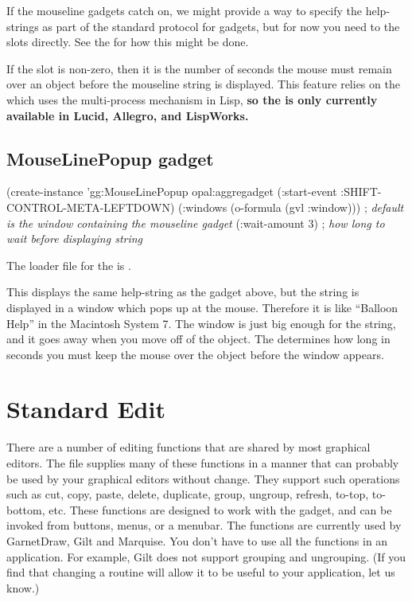 If the mouseline gadgets catch on, we might provide a way
to specify the help-strings as part of the standard 
protocol for gadgets, but for now you need to  the
 slots directly.  See the  for how
this might be done.

If the  slot is non-zero, then it is the number of
seconds the mouse must remain over an object before the mouseline
string is displayed.  This feature relies on the 
which uses the multi-process mechanism in Lisp, {\bf so the  is
only currently available in Lucid, Allegro, and LispWorks.}

\subsection{MouseLinePopup gadget}

\begin{programexample}
(create-instance 'gg:MouseLinePopup opal:aggregadget
  (:start-event :SHIFT-CONTROL-META-LEFTDOWN)
  (:windows (o-formula (gvl :window))) ; {\it default is the window containing the mouseline gadget}
  (:wait-amount 3) ; {\it how long to wait before displaying string}
\end{programexample}

The loader file for the  is .

This displays the same help-string as the  gadget above,
but the string is displayed in a window which pops up at the mouse.
Therefore it is like ``Balloon Help'' in the Macintosh System 7.
The window is just big enough for the string, and it goes away when
you move off of the object.  The  determines how long
in seconds you must keep the mouse over the object before the window
appears.





\section{Standard Edit}
\label{standardeditsec}

There are a number of editing functions that are
shared by most graphical editors.  The file 
supplies many of these functions in a manner that can probably be used by
your graphical editors without change.  They support such operations
such as cut, copy, paste, delete, duplicate, group, ungroup, refresh,
to-top, to-bottom, etc.  These functions are designed to work with the
 gadget, and can be invoked from buttons,
menus, or a menubar.
The  functions
are currently used by GarnetDraw, Gilt and Marquise.
You don't have to use all the functions in an application.  For
example, Gilt does not support grouping and ungrouping.
(If you find that changing a  routine will allow
it to be useful to your application, let us know.)

